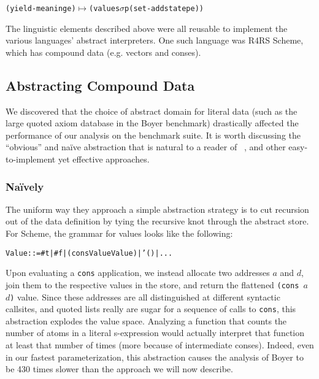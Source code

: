 \documentclass[preprint]{sigplanconf}
\begin{document}
\begin{center}
\begin{alltt}
(yield-meaning e) \(\longmapsto\) (values \(\sigma\)p (set-add statep e))
\end{alltt}
\end{center}

The linguistic elements described above were all reusable to implement
the various languages' abstract interpreters. One such language was
R4RS Scheme, which has compound data (e.g. vectors and conses). 

\subsection{Abstracting Compound Data}

We discovered that the choice of abstract domain for literal data
(such as the large quoted axiom database in the Boyer benchmark)
drastically affected the performance of our analysis on the benchmark
suite. It is worth discussing the ``obvious'' and na\"ive abstraction
that is natural to a reader of
~\citep{dvanhorn:VanHorn2011Abstracting}, and other easy-to-implement
yet effective approaches.

\subsubsection{Na\"ively}

The uniform way they approach a simple abstraction strategy is to cut
recursion out of the data definition by tying the recursive knot
through the abstract store. For Scheme, the grammar for values looks like the following:

\begin{alltt}
Value ::= #t | #f | (cons Value Value) | '() | ...
\end{alltt}

Upon evaluating a {\tt cons} application, we instead allocate two
addresses $a$ and $d$, join them to the respective values in the
store, and return the flattened {\tt (cons $a$ $d$)} value. Since
these addresses are all distinguished at different syntactic
callsites, and quoted lists really are sugar for a sequence of calls
to {\tt cons}, this abstraction explodes the value space. Analyzing a
function that counts the number of atoms in a literal s-expression
would actually interpret that function at least that number of times
(more because of intermediate conses). Indeed, even in our fastest
parameterization, this abstraction causes the analysis of Boyer to be
430 times slower than the approach we will now describe.
\end{document}
